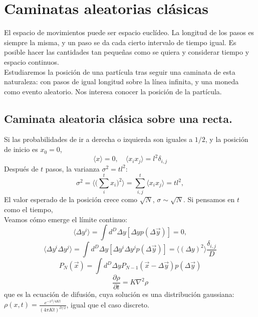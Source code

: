 
\section{Caminatas aleatorias clásicas}\label{CaminatasClasicas}
El espacio de movimientos puede ser espacio euclídeo. La longitud de los pasos es siempre la misma, y un paso se da cada cierto intervalo de tiempo igual. Es posible hacer las cantidades tan pequeñas como se quiera y considerar tiempo y espacio continuos.\\
Estudiaremos la posición de una partícula tras seguir una caminata de esta naturaleza: con pasos de igual longitud sobre la línea infinita, y una moneda como evento aleatorio. Nos interesa conocer la posición de la partícula.
\subsection{Caminata aleatoria clásica sobre una recta.}
Si las probabilidades de ir a derecha o izquierda son iguales a $1/2$, y la posición de inicio es $x_0=0$, 
\begin{equation}
\langle x\rangle=0,\quad \langle x_ix_j\rangle=l^2\delta_{i,j}
\end{equation}{}
Después de $t$ pasos, la varianza $\sigma^2=tl^2$:
\begin{equation}{}
\sigma^2=\Big \langle \big(\sum_i^t x_i \big)^2 \Big \rangle = \sum_{i,j}^t \langle x_i x_j \rangle = tl^2,
\end{equation}
El valor esperado de la posición crece como $\sqrt{N}$, $\sigma\sim \sqrt{N}$. Si pensamos en $t$ como el tiempo,\\
Veamos cómo emerge el límite continuo:
\begin{equation}
    \langle\Delta y^i\rangle=\int d^D \Delta y [\Delta y p(\Delta \Vec{y})]=0,
\end{equation}{}
\begin{equation}
    \langle\Delta y^i\Delta y^j\rangle=\int d^D \Delta y [\Delta y^i\Delta y^jp(\Delta \Vec{y})]=\langle(\Delta y)^2\rangle\frac{\delta_{i,j}}{D}
\end{equation}{}
\begin{equation}
P_N(\Vec{x})=\int d^D \Delta y P_{N-1}(\Vec{x}-\Delta \Vec{y})p(\Delta \Vec{y})    
\end{equation}{}
\begin{equation}
    \frac{\partial\rho}{\partial t}=K\nabla^2\rho
    \end{equation}{}
que es la ecuación de difusión, cuya solución es una distribución gaussiana: $\rho(x,t)=\frac{e^{-x^2/4Kt}}{(4\pi Kt)^{D/2}}$, igual que el caso discreto.

